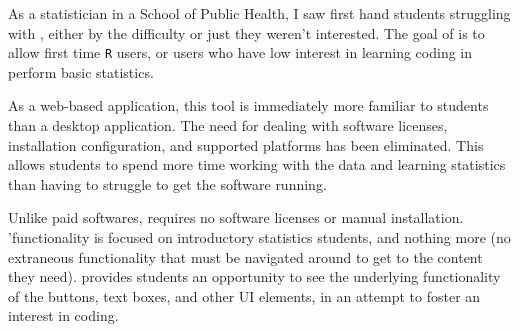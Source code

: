 As a statistician in a School of Public Health, I saw first hand students struggling with \R, either by the difficulty or just they weren't interested. The goal of \FIRSTkit is to allow first time {\tt R} users, or users who have low interest in learning coding in perform basic statistics.

As a web-based application, this tool is immediately more familiar to students than a desktop application. The need for dealing with software licenses, installation configuration, and supported platforms has been eliminated. This allows students to spend more time working with the data and learning statistics than having to struggle to get the software running.

Unlike paid softwares, \FIRSTkit requires no software licenses or manual installation. \FIRSTkit 'functionality is focused on introductory statistics students, and nothing more (no extraneous functionality that must be navigated around to get to the content they need). \FIRSTkit provides students an opportunity to see the underlying functionality of the buttons, text boxes, and other UI elements, in an attempt to foster an interest in coding.


